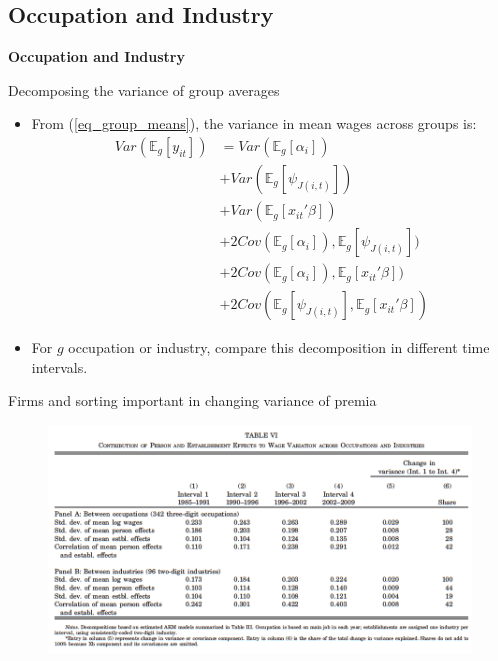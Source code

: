 \documentclass[notes=show]{beamer}
\begin{document}
\subsection*{Occupation and Industry}

\begin{frame}
	\centering
	\textbf{Occupation and Industry}
\end{frame}

\begin{frame}{Decomposing the variance of group averages}
\begin{itemize}
\item From (\ref{eq_group_means}), the variance in mean wages across groups is:
    \begin{align}
	   Var(\mathbb{E}_{g} \left[ y_{it} \right]) & = Var(\mathbb{E}_{g} \left[ \alpha_{i} \right]) \\
    & + Var(\mathbb{E}_{g} \left[ \psi_{J(i,t)} \right]) \nonumber \\
    & + Var(\mathbb{E}_{g} \left[ x_{it}'\beta \right]) \nonumber \\
    & + 2 Cov(\mathbb{E}_{g} \left[ \alpha_{i} \right]),\mathbb{E}_{g} \left[ \psi_{J(i,t)} \right]) \nonumber \\
    &  + 2 Cov(\mathbb{E}_{g} \left[ \alpha_{i} \right]),\mathbb{E}_{g} \left[ x_{it}'\beta \right]) \nonumber \\
    & + 2 Cov(\mathbb{E}_{g} \left[ \psi_{J(i,t)} \right],\mathbb{E}_{g} \left[ x_{it}'\beta \right]) \nonumber
    \end{align}
\item For $g$ occupation or industry, compare this decomposition in different time intervals.
 \end{itemize}
\end{frame}

\begin{frame}{Firms and sorting important in changing variance of premia}
\begin{figure}
 \includegraphics[width=\textwidth]{figures/Table6} 
\end{figure}
\end{frame}
\end{document}
